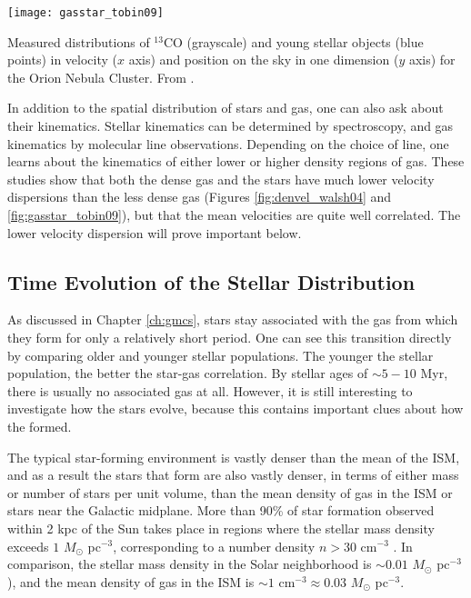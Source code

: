 \begin{marginfigure}
\texttt{[image: gasstar\_tobin09]}
\caption[Spatial and velocity distributions of gas and stars]{
\label{fig:gasstar_tobin09}
Measured distributions of $^{13}$CO (grayscale) and young stellar objects (blue points) in velocity ($x$ axis) and position on the sky in one dimension ($y$ axis) for the Orion Nebula Cluster. From \citet{tobin09a}.
}
\end{marginfigure}

In addition to the spatial distribution of stars and gas, one can also ask about their kinematics. Stellar kinematics can be determined by spectroscopy, and gas kinematics by molecular line observations. Depending on the choice of line, one learns about the kinematics of either lower or higher density regions of gas. These studies show that both the dense gas and the stars have much lower velocity dispersions than the less dense gas (Figures \ref{fig:denvel_walsh04} and \ref{fig:gasstar_tobin09}), but that the mean velocities are quite well correlated. The lower velocity dispersion will prove important below.

\subsection{Time Evolution of the Stellar Distribution}

As discussed in Chapter \ref{ch:gmcs}, stars stay associated with the gas from which they form for only a relatively short period. One can see this transition directly by comparing older and younger stellar populations. The younger the stellar population, the better the star-gas correlation. By stellar ages of $\sim 5-10$ Myr, there is usually no associated gas at all. However, it is still interesting to investigate how the stars evolve, because this contains important clues about how the formed.

The typical star-forming environment is vastly denser than the mean of the ISM, and as a result the stars that form are also vastly denser, in terms of either mass or number of stars per unit volume, than the mean density of gas in the ISM or stars near the Galactic midplane. More than 90\% of star formation observed within 2 kpc of the Sun takes place in regions where the stellar mass density exceeds $1$ $M_\odot$ pc$^{-3}$, corresponding to a number density $n > 30$ cm$^{-3}$ \citet{lada03a}. In comparison, the stellar mass density in the Solar neighborhood is $\sim 0.01$ $M_\odot$ pc$^{-3}$ \citep{holmberg00a}), and the mean density of gas in the ISM is $\sim 1$ cm$^{-3} \approx 0.03$ $M_\odot$ pc$^{-3}$.

